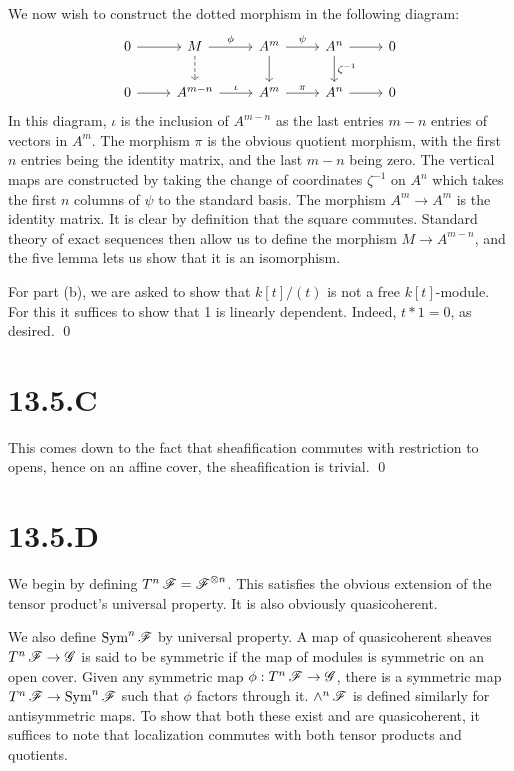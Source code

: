 \documentclass{article}
\begin{document}
We now wish to construct the dotted morphism in the following diagram:
\[\begin{tikzcd}
        0 & M         & {A^m} & {A^n} & 0 \\
        0 & {A^{m-n}} & {A^m} & {A^n} & 0
        \arrow[from=1-4, to=1-5]
        \arrow["\psi", from=1-3, to=1-4]
        \arrow["\phi", from=1-2, to=1-3]
        \arrow[from=1-1, to=1-2]
        \arrow["\iota", from=2-2, to=2-3]
        \arrow["\pi", from=2-3, to=2-4]
        \arrow[from=2-4, to=2-5]
        \arrow["{\zeta^{-1}}", from=1-4, to=2-4]
        \arrow[from=1-3, to=2-3]
        \arrow[from=2-1, to=2-2]
        \arrow[dashed, from=1-2, to=2-2]
    \end{tikzcd}\] In this diagram, $\iota$ is the
inclusion of $A^{m-n}$ as the last entries
$m-n$ entries of vectors in $A^m$. The
morphism $\pi$ is the obvious quotient morphism, with the
first $n$ entries being the identity matrix, and the last
$m-n$ being zero. The vertical maps are constructed by taking
the change of coordinates $\zeta^{-1}$ on $A^n$
which takes the first $n$ columns of
$\psi$ to the standard basis. The morphism
$A^m \to A^m$ is the identity matrix. It is clear by definition that
the square commutes. Standard theory of exact sequences then allow us to define
the morphism $M \to A^{m-n}$, and the five lemma lets us show that it
is an isomorphism.

For part (b), we are asked to show that $k[t]/(t)$ is not a free
$k[t]$-module. For this it suffices to show that 1 is linearly
dependent. Indeed, $t*1=0$, as desired. \qed

\section*{13.5.C}
This comes down to the fact that sheafification commutes with restriction to
opens, hence on an affine cover, the sheafification is trivial. \qed

\section*{13.5.D}
We begin by defining $T^n \operatorname{\mathscr{F}} = \operatorname{\mathscr{F}}^{\otimes n}$. This satisfies the obvious
extension of the tensor product's universal property. It is also obviously
quasicoherent.

We also define $\operatorname{Sym}^n \operatorname{\mathscr{F}}$ by universal property. A map of
quasicoherent sheaves $T^n \operatorname{\mathscr{F}} \to \operatorname{\mathscr{G}}$ is said to be symmetric if the
map of modules is symmetric on an open cover. Given any symmetric map
$\phi: T^n \operatorname{\mathscr{F}} \to \operatorname{\mathscr{G}}$, there is a symmetric map $T^n \operatorname{\mathscr{F}} \to \operatorname{Sym}^n \operatorname{\mathscr{F}}$ such
that $\phi$ factors through it. $\wedge^n \operatorname{\mathscr{F}}$ is
defined similarly for antisymmetric maps. To show that both these exist and are
quasicoherent, it suffices to note that localization commutes with both tensor
products and quotients.
\end{document}
